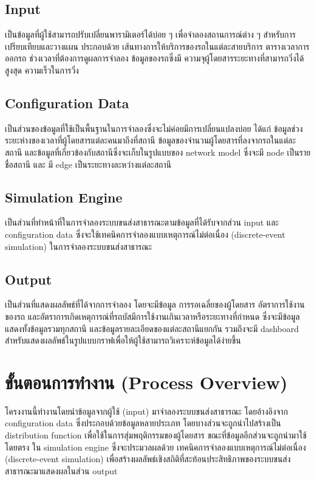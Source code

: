 \subsection{Input}
\begin{mypara}
  \indent เป็นข้อมูลที่ผู้ใช้สามารถปรับเปลี่ยนพารามิเตอร์ได้บ่อย ๆ เพื่อจำลองสถานการณ์ต่าง ๆ 
  สำหรับการเปรียบเทียบและวางแผน ประกอบด้วย เส้นทางการให้บริการของรถในแต่ละสายบริการ 
  ตารางเวลาการออกรถ ช่วงเวลาที่ต้องการดูผลการจําลอง ข้อมูลของรถซึ่งมี 
  ความจุผู้โดยสารระยะทางที่สามารถวิ่งได้สูงสุด ความเร็วในการวิ่ง
\end{mypara}
\subsection{Configuration Data}
\begin{mypara}
  \indent เป็นส่วนของข้อมูลที่ใช้เป็นพื้นฐานในการจำลองซึ่งจะไม่ค่อยมีการเปลี่ยนแปลงบ่อย 
  ได้แก่ ข้อมูลช่วงระยะห่างของเวลาที่ผู้โดยสารแต่ละคนมาถึงที่สถานี ข้อมูลของจำนวนผู้โดยสารที่ลงจากรถในแต่ละสถานี 
  และข้อมูลที่เกี่ยวข้องกับสถานีซึ่งจะเก็บในรูปแบบของ network model ซึ่งจะมี 
  node เป็นรายชื่อสถานี และ มี edge เป็นระยะทางละหว่างแต่ละสถานี
  \end{mypara}
\subsection{Simulation Engine}
\begin{mypara}
  \indent เป็นส่วนที่ทำหน้าที่ในการจำลองระบบขนส่งสาธารณะตามข้อมูลที่ได้รับจากส่วน input 
  และ configuration data ซึ่งจะใช้เทคนิคการจำลองแบบเหตุการณ์ไม่ต่อเนื่อง (discrete-event simulation) 
  ในการจำลองระบบขนส่งสาธารณะ 
\end{mypara}
\subsection{Output}
\begin{mypara}
  \indent เป็นส่วนที่แสดงผลลัพธ์ที่ได้จากการจำลอง โดยจะมีข้อมูล การรอเฉลี่ยของผู้โดยสาร อัตราการใช้งานของรถ 
  และอัตราการเกิดเหตุการณ์ที่รถบัสมีการใช้งานเกินเวลาหรือระยะทางที่กำหนด
  ซึ่งจะมีข้อมูลแสดงทั้งข้อมูลรวมทุกสถานี และข้อมูลรายละเอียดของแต่ละสถานีแยกกัน รวมถึงจะมี dashboard 
  สำหรับแสดงผลลัพธ์ในรูปแบบกราฟเพื่อให้ผู้ใช้สามารถวิเคราะห์ข้อมูลได้ง่ายขึ้น
\end{mypara}
\section{ ขั้นตอนการทำงาน (Process Overview)}
\begin{mypara}
    \indent โครงงานนี้ทำงานโดยนำข้อมูลจากผู้ใช้ (input) มาจำลองระบบขนส่งสาธารณะ 
    โดยอ้างอิงจาก configuration data ซึ่งประกอบด้วยข้อมูลหลายประเภท 
    โดยบางส่วนจะถูกนำไปสร้างเป็น distribution function เพื่อใช้ในการสุ่มพฤติกรรมของผู้โดยสาร 
    ขณะที่ข้อมูลอีกส่วนจะถูกนำมาใช้โดยตรง ใน simulation engine ซึ่งจะประมวลผลด้วย
    เทคนิคการจำลองแบบเหตุการณ์ไม่ต่อเนื่อง (discrete-event simulation) 
    เพื่อสร้างผลลัพธ์เชิงสถิติที่สะท้อนประสิทธิภาพของระบบขนส่งสาธารณะมาแสดงผลในส่วน output
\end{mypara}

